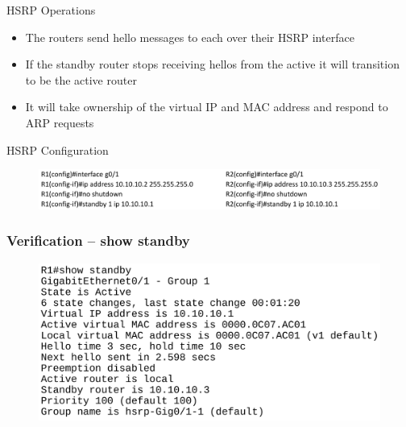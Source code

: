 \documentclass[pdflatex,compress,mathserif]{beamer}
\begin{document}
\begin{frame}{HSRP Operations}
	\begin{itemize}
		\item The routers send hello messages to each over their HSRP interface
		\item If the standby router stops receiving hellos from the active it will transition
to be the active router
		\item It will take ownership of the virtual IP and MAC address and respond to
ARP requests
	\end{itemize}
\end{frame}

\begin{frame}{HSRP Configuration}
	\begin{figure}
		\centering
		\includegraphics[width=\linewidth]{img/img12}
	\end{figure}
\end{frame}

\begin{frame}
	\frametitle{Verification – show standby}
	\begin{figure}
		\centering
		\includegraphics[width=\linewidth]{img/img13}
	\end{figure}
\end{frame}
\end{document}
